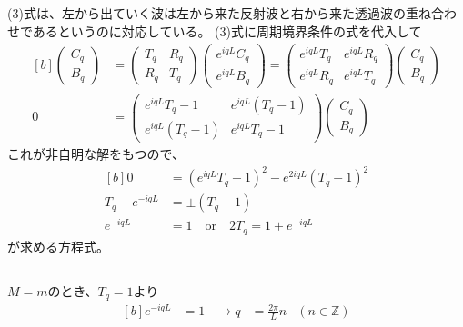 \documentclass[../ap_2022.tex]{subfiles}
\begin{document}
\subsection{}
(3)式は、左から出ていく波は左から来た反射波と右から来た透過波の重ね合わせであるというのに対応している。
(3)式に周期境界条件の式を代入して
\begin{equation}\begin{aligned}[b]
    \begin{pmatrix}
        C_q\\
        B_q
    \end{pmatrix}
    &=\begin{pmatrix}
        T_q & R_q\\
        R_q & T_q
    \end{pmatrix}\begin{pmatrix}
        e^{iqL}C_q\\
        e^{iqL}B_q
    \end{pmatrix}
    =\begin{pmatrix}
        e^{iqL}T_q & e^{iqL}R_q\\
        e^{iqL}R_q & e^{iqL}T_q
    \end{pmatrix}\begin{pmatrix}
        C_q\\
        B_q
    \end{pmatrix}\\
    0&=\begin{pmatrix}
        e^{iqL}T_q-1 & e^{iqL}(T_q-1)\\
        e^{iqL}(T_q-1) & e^{iqL}T_q-1
    \end{pmatrix}\begin{pmatrix}
        C_q\\
        B_q
    \end{pmatrix}
\end{aligned}\end{equation}
これが非自明な解をもつので、
\begin{equation}\begin{aligned}[b]
    0 &= (e^{iqL}T_q-1)^2-e^{2iqL}(T_q-1)^2\\
    T_q-e^{-iqL} &= \pm (T_q-1)\\
    e^{-iqL} &= 1\quad\text{or}\quad
        2T_q = 1+e^{-iqL}
\end{aligned}\end{equation}
が求める方程式。

\subsection{}
\(M=m\)のとき、\(T_q=1\)より
\begin{equation}\begin{aligned}[b]
    e^{-iqL} &= 1 &\rightarrow q &= \frac{2\pi}{L}n & (n\in\mathbb{Z})
\end{aligned}\end{equation}
\end{document}
